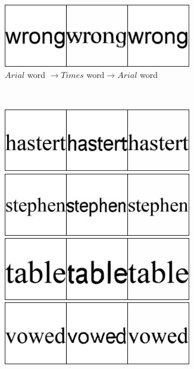 \documentclass[10pt,twocolumn,letterpaper]{article}
\begin{document}
\begin{figure}[!htb]
\begin{subfigure}[]{0.49\textwidth}
		 \vspace{0.3cm}
		 \includegraphics[width=0.9\textwidth]{test_a_2_b_490}
		 \caption{$Arial$ word $\rightarrow Times$ word$\rightarrow Arial$ word}
         \label{fig:arial2times_word}
     \end{subfigure}
     ~
     \begin{subfigure}[]{0.49\textwidth}
         \centering
         \includegraphics[width=0.9\textwidth]{test_b_2_a_202}\\
         \vspace{0.3cm}
		 \includegraphics[width=0.9\textwidth]{test_b_2_a_420}\\
		 \vspace{0.3cm}
		 \includegraphics[width=0.9\textwidth]{test_b_2_a_436}\\
		 \vspace{0.3cm}
		 \includegraphics[width=0.9\textwidth]{test_b_2_a_473}\\

\end{subfigure}
\end{figure}
\end{document}
